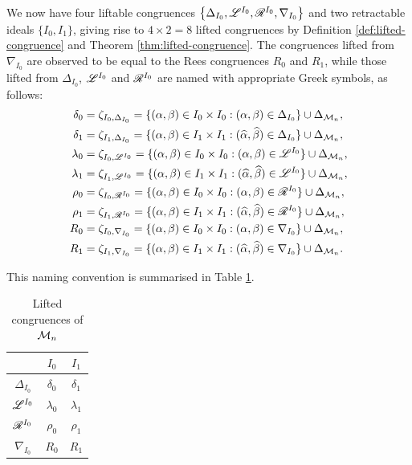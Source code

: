 We now have four liftable congruences $\left\{\Delta_{I_0}, \mathscr{L}^{I_0}, \mathscr{R}^{I_0}, \nabla_{I_0}\right\}$ and
two retractable ideals $\{I_0, I_1\}$, giving rise to $4 \times 2 = 8$ lifted
congruences by Definition \ref{def:lifted-congruence} and Theorem
\ref{thm:lifted-congruence}.  The congruences lifted from $\nabla_{I_0}$ are
observed to be equal to the Rees congruences $R_0$ and $R_1$, while those lifted
from $\Delta_{I_0}$, $\mathscr{L}^{I_0}$ and $\mathscr{R}^{I_0}$ are named with appropriate Greek symbols,
as follows:
\begin{align*}
  \delta_0 &= \zeta_{I_0,\Delta_{I_0}}
  = \{(\alpha,\beta) \in I_0 \times I_0 :
    (\alpha, \beta) \in \Delta_{I_0}\} \cup \Delta_{\mathcal{M}_n}, \\
  \delta_1 &= \zeta_{I_1,\Delta_{I_0}}
  = \{(\alpha,\beta) \in I_1 \times I_1 :
    (\widehat\alpha, \widehat\beta) \in \Delta_{I_0}\} \cup \Delta_{\mathcal{M}_n}, \\
  \lambda_0 &=\zeta_{I_0,\mathscr{L}^{I_0}}
  = \{(\alpha,\beta) \in I_0 \times I_0 :
    (\alpha, \beta) \in \mathscr{L}^{I_0}\} \cup \Delta_{\mathcal{M}_n}, \\
  \lambda_1 &= \zeta_{I_1,\mathscr{L}^{I_0}}
  = \{(\alpha,\beta) \in I_1 \times I_1 :
    (\widehat\alpha, \widehat\beta) \in \mathscr{L}^{I_0}\} \cup \Delta_{\mathcal{M}_n}, \\
  \rho_0 &= \zeta_{I_0,\mathscr{R}^{I_0}}
  = \{(\alpha,\beta) \in I_0 \times I_0 :
    (\alpha, \beta) \in \mathscr{R}^{I_0}\} \cup \Delta_{\mathcal{M}_n}, \\
  \rho_1 &= \zeta_{I_1,\mathscr{R}^{I_0}}
  = \{(\alpha,\beta) \in I_1 \times I_1 :
    (\widehat\alpha, \widehat\beta) \in \mathscr{R}^{I_0}\} \cup \Delta_{\mathcal{M}_n}, \\
  R_0 &= \zeta_{I_0,\nabla_{I_0}}
  = \{(\alpha,\beta) \in I_0 \times I_0 :
    (\alpha, \beta) \in \nabla_{I_0}\} \cup \Delta_{\mathcal{M}_n}, \\
  R_1 &= \zeta_{I_1,\nabla_{I_0}}
  = \{(\alpha,\beta) \in I_1 \times I_1 :
    (\widehat\alpha, \widehat\beta) \in \nabla_{I_0}\} \cup \Delta_{\mathcal{M}_n}.
\end{align*}

This naming convention is summarised in Table \ref{tab:mn-lifted-congruences}.

\begin{table}[ht]
  \centering
  \renewcommand\arraystretch{1.3}
  \begin{tabular}[ht]{| c | c | c |}
    \cline{2-3}
    \mc1{c|}{} & $I_0$ & $I_1$ \\ \hline
    $\Delta_{I_0}$ & $\delta_0$ & $\delta_1$ \\ \hline
    $\mathscr{L}^{I_0}$ & $\lambda_0$ & $\lambda_1$ \\ \hline
    $\mathscr{R}^{I_0}$ & $\rho_0$ & $\rho_1$ \\ \hline
    $\nabla_{I_0}$ & $R_0$ & $R_1$ \\ \hline
  \end{tabular}
  \caption{Lifted congruences of $\mathcal{M}_n$}
  \label{tab:mn-lifted-congruences}
\end{table}

